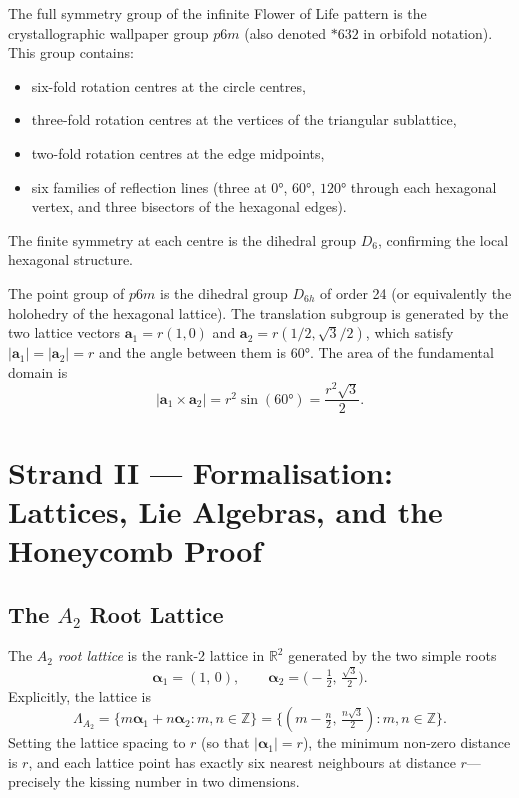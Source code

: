 The full symmetry group of the infinite Flower of Life pattern is the
crystallographic wallpaper group \(p6m\) (also denoted \(*632\) in
orbifold notation).  This group contains:
\begin{itemize}
  \item six-fold rotation centres at the circle centres,
  \item three-fold rotation centres at the vertices of the triangular sublattice,
  \item two-fold rotation centres at the edge midpoints,
  \item six families of reflection lines (three at \(0°\), \(60°\), \(120°\)
        through each hexagonal vertex, and three bisectors of the hexagonal
        edges).
\end{itemize}
The finite symmetry at each centre is the dihedral group \(D_6\), confirming
the local hexagonal structure.

The point group of \(p6m\) is the dihedral group \(D_{6h}\) of order 24
(or equivalently the holohedry of the hexagonal lattice).  The translation
subgroup is generated by the two lattice vectors
\(\mathbf{a}_1 = r(1,0)\) and \(\mathbf{a}_2 = r(1/2,\sqrt{3}/2)\),
which satisfy \(|\mathbf{a}_1|=|\mathbf{a}_2|=r\) and the angle between
them is \(60°\).  The area of the fundamental domain is
\[
  |\mathbf{a}_1 \times \mathbf{a}_2| = r^2 \sin(60°) = \frac{r^2\sqrt{3}}{2}.
\]

\section{Strand II — Formalisation: Lattices, Lie Algebras,
         and the Honeycomb Proof}
\label{sec:fol-strand2}

\subsection{The \(A_2\) Root Lattice}
\label{subsec:fol-a2-lattice}

The \emph{\(A_2\) root lattice} is the rank-2 lattice in \(\mathbb{R}^2\)
generated by the two simple roots
\[
  \boldsymbol{\alpha}_1 = (1,\,0), \qquad
  \boldsymbol{\alpha}_2 = \bigl(-\tfrac{1}{2},\,\tfrac{\sqrt{3}}{2}\bigr).
\]
Explicitly, the lattice is
\[
  \Lambda_{A_2}
  = \bigl\{m\boldsymbol{\alpha}_1 + n\boldsymbol{\alpha}_2 :
           m,n\in\mathbb{Z}\bigr\}
  = \bigl\{(m-\tfrac{n}{2},\,\tfrac{n\sqrt{3}}{2}) :
           m,n\in\mathbb{Z}\bigr\}.
\]
Setting the lattice spacing to \(r\) (so that \(|\boldsymbol{\alpha}_1|=r\)),
the minimum non-zero distance is \(r\), and each lattice point has exactly
six nearest neighbours at distance \(r\)—precisely the kissing number in
two dimensions.

